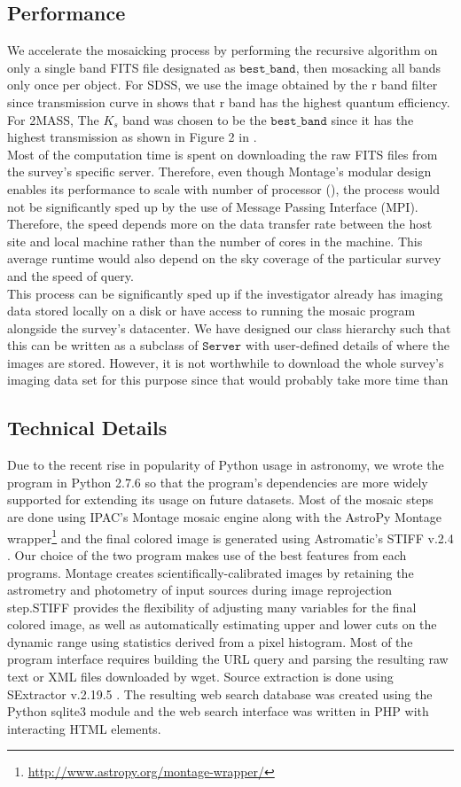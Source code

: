 \documentclass[5p]{elsarticle}
\begin{document}
	\subsection{Performance}	
	\indent We accelerate the mosaicking process by performing the recursive algorithm on only a single band FITS file designated as $\texttt{best\_band}$, then mosacking all bands only once per object. For SDSS, we use the image obtained by the r band filter since transmission curve in \citealp{edr} shows that r band has the highest quantum efficiency. For 2MASS, The $K_s$ band was chosen to be the $\texttt{best\_band}$ since it has the highest transmission as shown  in Figure 2 in \citealp{2mass}.
	\\
	 \indent  Most of the computation time is spent on downloading the raw FITS files from the survey's specific server. Therefore, even though Montage's modular design enables its performance to scale with number of processor  (\citealp{montage}), the process would not be significantly sped up by the use of Message Passing Interface (MPI). Therefore, the speed depends more on the data transfer rate between the host site and local machine rather than the number of cores in the machine. This average runtime would also depend on the sky coverage of the  particular survey and the speed of query.
	\\ \indent This process can  be significantly sped up if the investigator already has imaging data stored locally on a disk or have access to running the mosaic program alongside the survey's datacenter. We have designed our class hierarchy such that this can be written as a subclass of $\texttt{Server}$ with user-defined details of where the images are stored. However, it is not worthwhile to download the whole survey's imaging data set for this purpose since that would probably take more time than 
		\subsection{Technical Details}
		Due to the recent rise in popularity of Python usage in astronomy, we wrote the program in Python 2.7.6 so that the program's dependencies are more widely supported for extending its usage on future datasets. Most of the mosaic steps are done using IPAC's Montage  \citealp{montage} mosaic engine along with the AstroPy Montage wrapper\footnote{\url{http://www.astropy.org/montage-wrapper/}} and the final colored image is generated using Astromatic's STIFF v.2.4 \citealp{stiff}. Our choice of the two program makes use of the best features from each programs. Montage creates scientifically-calibrated images by retaining the astrometry and photometry of input sources during image reprojection step.STIFF provides the flexibility of adjusting many variables for the final colored image, as well as automatically estimating upper and lower cuts on the dynamic range using statistics derived from a pixel histogram. Most of the program interface requires building the URL query and parsing the resulting raw text or XML files downloaded by wget. Source extraction is done using SExtractor v.2.19.5 \citealp{sextractor}. The resulting web search database was created using the Python sqlite3 module and the web search interface was written in PHP with interacting HTML elements.
\end{document}
